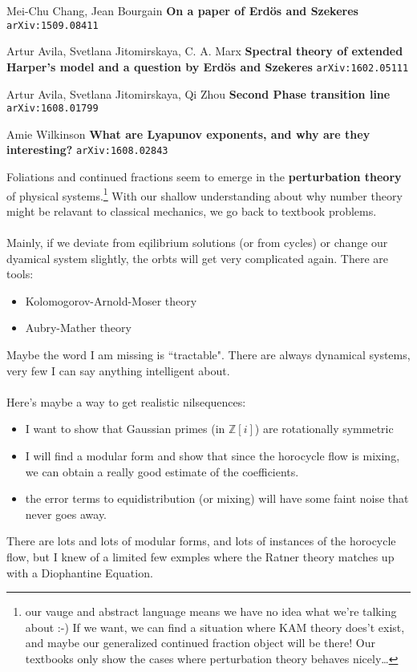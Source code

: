 \documentclass[12pt]{article}
\begin{document}
\begin{thebibliography}{}

\item Mei-Chu Chang, Jean Bourgain \textbf{On a paper of Erd\"{o}s and Szekeres} \texttt{arXiv:1509.08411}

\item Artur Avila, Svetlana Jitomirskaya, C. A. Marx \textbf{Spectral theory of extended Harper's model and a question by Erd\"{o}s and Szekeres} \texttt{arXiv:1602.05111} 

\item Artur Avila, Svetlana Jitomirskaya, Qi Zhou \textbf{Second Phase transition line} \texttt{arXiv:1608.01799} 

\item Amie Wilkinson \textbf{What are Lyapunov exponents, and why are they interesting?} \texttt{arXiv:1608.02843} 

\newpage

\noindent Foliations and continued fractions seem to emerge in the \textbf{perturbation theory} of physical systems.\footnote{our vauge and abstract language means we have no idea what we're talking about :-)  If we want, we can find a situation where KAM theory does't exist, and maybe our generalized continued fraction object will be there!  Our textbooks only show the cases where perturbation theory behaves nicely\dots } With our shallow understanding about why number theory might be relavant to classical mechanics, we go back to textbook problems.  \\ \\
Mainly, if we deviate from eqilibrium solutions (or from cycles) or change our dyamical system slightly, the orbts will get very complicated again.  There are tools:
\begin{itemize}
\item Kolomogorov-Arnold-Moser theory
\item Aubry-Mather theory
\end{itemize}
Maybe the word I am missing is ``tractable".  There are always dynamical systems, very few I can say anything intelligent about. \\ \\
Here's maybe a way to get realistic nilsequences:
\begin{itemize}
\item I want to show that Gaussian primes (in $\mathbb{Z}[i]$) are rotationally symmetric
\item I will find a modular form and show that since the horocycle flow is mixing,
we can obtain a really good estimate of the coefficients.  
\item the error terms to equidistribution (or mixing) will have some faint noise that never goes away.
\end{itemize}
There are lots and lots of modular forms, and lots of instances of the horocycle flow, but I knew of a limited few exmples where the Ratner theory matches up with a Diophantine Equation. 
\vfill


\end{thebibliography}
\end{document}

